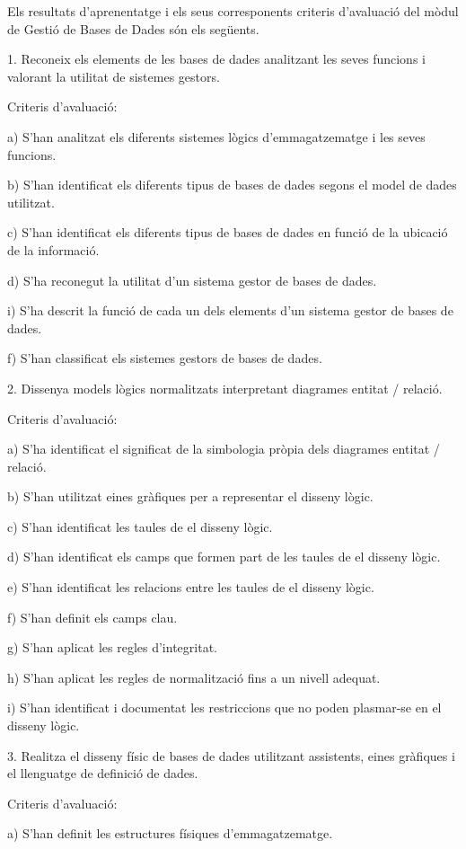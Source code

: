 \documentclass[catalan, a4paper, 12pt, titlepage]{article}
\begin{document}
Els resultats d'aprenentatge i els seus corresponents criteris d'avaluació del mòdul de Gestió de Bases de Dades són els següents.

1. Reconeix els elements de les bases de dades analitzant les seves funcions i valorant la utilitat de sistemes gestors.

Criteris d'avaluació:

a) S'han analitzat els diferents sistemes lògics d'emmagatzematge i les seves funcions.

b) S'han identificat els diferents tipus de bases de dades segons el model de dades utilitzat.

c) S'han identificat els diferents tipus de bases de dades en funció de la ubicació de la informació.

d) S'ha reconegut la utilitat d'un sistema gestor de bases de dades.

i) S'ha descrit la funció de cada un dels elements d'un sistema gestor de bases de dades.

f) S'han classificat els sistemes gestors de bases de dades.

2. Dissenya models lògics normalitzats interpretant diagrames entitat / relació.

Criteris d'avaluació:

a) S'ha identificat el significat de la simbologia pròpia dels diagrames entitat / relació.

b) S'han utilitzat eines gràfiques per a representar el disseny lògic.

c) S'han identificat les taules de el disseny lògic.

d) S'han identificat els camps que formen part de les taules de el disseny lògic.

e) S'han identificat les relacions entre les taules de el disseny lògic.

f) S'han definit els camps clau.

g) S'han aplicat les regles d'integritat.

h) S'han aplicat les regles de normalització fins a un nivell adequat.

i) S'han identificat i documentat les restriccions que no poden plasmar-se en el disseny lògic.

3. Realitza el disseny físic de bases de dades utilitzant assistents, eines gràfiques i el llenguatge de definició de dades.

Criteris d'avaluació:

a) S'han definit les estructures físiques d'emmagatzematge.
\end{document}
